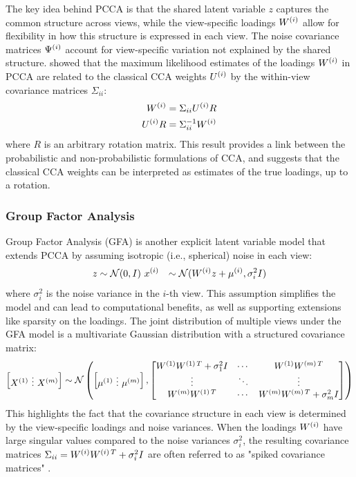 The key idea behind PCCA is that the shared latent variable $z$ captures the common structure across views, while the view-specific loadings $W^{(i)}$ allow for flexibility in how this structure is expressed in each view. The noise covariance matrices $\Psi^{(i)}$ account for view-specific variation not explained by the shared structure.
\citet{bach2005probabilistic} showed that the maximum likelihood estimates of the loadings $W^{(i)}$ in PCCA are related to the classical CCA weights $U^{(i)}$ by the within-view covariance matrices $\Sigma_{ii}$:
\begin{align}\label{eq:weights-to-loadings}
W^{(i)} &= \Sigma_{ii} U^{(i)} R\\
U^{(i)} R &= \Sigma_{ii}^{-1} W^{(i)}
\end{align}
where $R$ is an arbitrary rotation matrix. This result provides a link between the probabilistic and non-probabilistic formulations of CCA, and suggests that the classical CCA weights can be interpreted as estimates of the true loadings, up to a rotation.
\subsubsection{Group Factor Analysis}
Group Factor Analysis (GFA) \citep{klami2014group} is another explicit latent variable model that extends PCCA by assuming isotropic (i.e., spherical) noise in each view:
\begin{align}
z &\sim \mathcal{N}(0, I)\
x^{(i)} &\sim \mathcal{N}(W^{(i)} z + \mu^{(i)}, \sigma_i^2 I)
\end{align}
where $\sigma_i^2$ is the noise variance in the $i$-th view. This assumption simplifies the model and can lead to computational benefits, as well as supporting extensions like sparsity on the loadings.
The joint distribution of multiple views under the GFA model is a multivariate Gaussian distribution with a structured covariance matrix:
\begin{align}
\begin{bmatrix}
X^{(1)} \ \vdots \ X^{(m)}
\end{bmatrix} \sim \mathcal{N} \left( \begin{bmatrix}
\mu^{(1)} \ \vdots \ \mu^{(m)}
\end{bmatrix}, \begin{bmatrix}
W^{(1)}W^{(1)\,T} + \sigma_1^2 I & \cdots & W^{(1)}W^{(m)\,T} \\
\vdots & \ddots & \vdots \\
W^{(m)}W^{(1)\,T} & \cdots & W^{(m)}W^{(m)\,T} + \sigma_m^2 I
\end{bmatrix} \right)
\end{align}
This highlights the fact that the covariance structure in each view is determined by the view-specific loadings and noise variances. When the loadings $W^{(i)}$ have large singular values compared to the noise variances $\sigma_i^2$, the resulting covariance matrices $\Sigma_{ii} = W^{(i)}W^{(i)\,T} + \sigma_i^2 I$ are often referred to as "spiked covariance matrices" \citep{johnstone2001distribution}.


